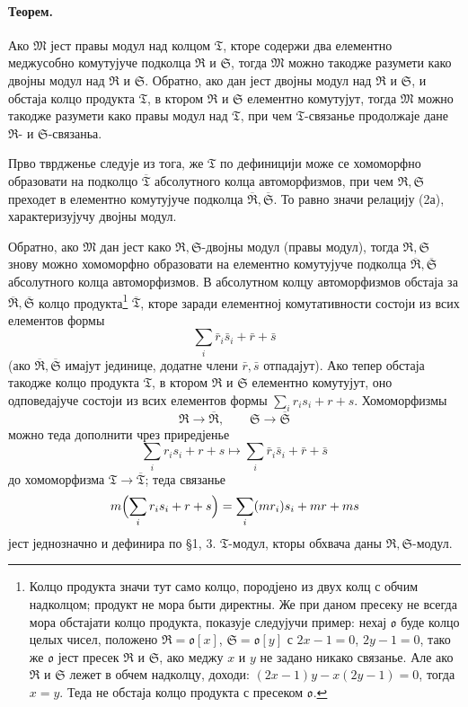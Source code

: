 ﻿\documentclass[11pt]{article}
\providecommand{\frM}{\mathfrak M}
\providecommand{\frR}{\mathfrak R}
\providecommand{\frS}{\mathfrak S}
\providecommand{\frT}{\mathfrak T}
\providecommand{\frako}{\mathfrak o}
\begin{document}
\paragraph{Теорем.}
Ако \(\frM\) јест правы модул над колцом \(\frT\), кторе содержи два елементно меджусобно комутујуче подколца \(\frR\) и \(\frS\), тогда \(\frM\) можно такодже разумети како двојны модул над \(\frR\) и \(\frS\). Обратно, ако дан јест двојны модул над \(\frR\) и \(\frS\), и обстаја колцо продукта \(\frT\), в ктором \(\frR\) и \(\frS\) елементно комутујут, тогда \(\frM\) можно такодже разумети како правы модул над \(\frT\), при чем \(\frT\)-связанье продолжаје дане \(\frR\)- и \(\frS\)-связаньа.

Прво тврдженье следује из тога, же \(\frT\) по дефиницији може се хомоморфно образовати на подколцо \(\overline{\frT}\) абсолутного колца автоморфизмов, при чем \(\frR,\frS\) преходет в елементно комутујуче подколца \(\overline{\frR},\overline{\frS}\). То равно значи релацију (2а), характеризујучу двојны модул.

Обратно, ако \(\frM\) дан јест како \(\frR,\frS\)-двојны модул (правы модул), тогда \(\frR,\frS\) знову можно хомоморфно образовати на елементно комутујуче подколца \(\overline{\frR},\overline{\frS}\) абсолутного колца автоморфизмов. В абсолутном колцу автоморфизмов обстаја за \(\overline{\frR},\overline{\frS}\) колцо продукта\footnote{Колцо продукта значи тут само колцо, породјено из двух колц с обчим надколцом; продукт не мора быти директны. Же при даном пресеку не всегда мора обстајати колцо продукта, показује следујучи пример: нехај \(\frako\) буде колцо целых чисел, положено \(\frR=\frako[x]\), \(\frS=\frako[y]\) с \(2x-1=0\), \(2y-1=0\), тако же \(\frako\) јест пресек \(\frR\) и \(\frS\), ако меджу \(x\) и \(y\) не задано никако связанье. Але ако \(\frR\) и \(\frS\) лежет в обчем надколцу, доходи: \((2x-1)y-x(2y-1)=0\), тогда \(x=y\). Теда не обстаја колцо продукта с пресеком \(\frako\).} \(\overline{\frT}\), кторе заради елементној комутативности состоји из всих елементов формы
\[
        \sum_i \bar r_i\bar s_i+\bar r+\bar s
\]
(ако \(\overline{\frR},\overline{\frS}\) имајут јединице, додатне члени \(\bar r,\bar s\) отпадајут). Ако тепер обстаја такодже колцо продукта \(\frT\), в ктором \(\frR\) и \(\frS\) елементно комутујут, оно одповедајуче состоји из всих елементов формы \(\sum_i r_i s_i+r+s\). Хомоморфизмы
\[
        \frR\to\overline{\frR},\qquad \frS\to\overline{\frS}
\]
можно теда дополнити чрез приредјенье
\[
        \sum_i r_i s_i+r+s
        \longmapsto
        \sum_i \bar r_i\bar s_i+\bar r+\bar s
\]
до хомоморфизма \(\frT\to\overline{\frT}\); теда связанье
\[
        m\Bigl(\sum_i r_i s_i+r+s\Bigr)
        =\sum_i (m r_i)s_i+m r+m s
\]
јест једнозначно и дефинира по §1, 3. \(\frT\)-модул, кторы обхвача даны \(\frR,\frS\)-модул.
\end{document}
